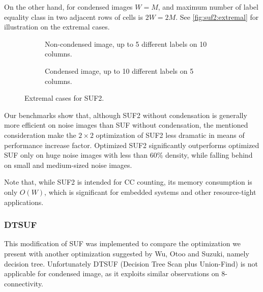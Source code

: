 \documentclass{llncs}
\begin{document}
On the other hand, for condensed images $W=M$, and maximum number of label equality
class in two adjacent rows of cells is $2W=2M$.
See \autoref{fig:suf2:extremal} for illustration on the extremal cases.

\begin{figure}
  \centering
  \begin{subfigure}{0.475\linewidth}
    \centering
    \caption{Non-condensed image, up to 5 different labels on 10 columns.}
  \end{subfigure}
  \quad
  \begin{subfigure}{0.475\linewidth}
    \centering
    \caption{Condensed image, up to 10 different labels on 5 columns.}
  \end{subfigure}
  \caption{Extremal cases for SUF2.}
  \label{fig:suf2:extremal}
\end{figure}

Our benchmarks show that, although SUF2 without condensation is generally more
efficient on noise images than SUF without condensation, the mentioned
consideration make the $2 \times 2$ optimization
of SUF2 less dramatic in means of performance increase factor.
Optimized SUF2 significantly outperforms optimized SUF only on
huge noise images with less than 60\% density, while falling behind on
small and medium-sized noise images.

Note that, while SUF2 is intended for CC counting, its memory
consumption is only $O(W)$, which is significant for embedded systems and
other resource-tight applications.

\subsubsection{DTSUF}

This modification of SUF was implemented to compare the optimization we present with
another optimization suggested by Wu, Otoo and Suzuki, %
namely decision tree.
Unfortunately DTSUF (Decision Tree Scan plus Union-Find) is not
applicable for condensed image, as it exploits similar observations on 8-connectivity.
\end{document}
